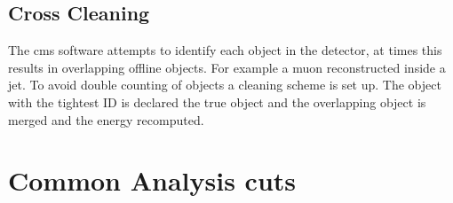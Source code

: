 \subsection{Cross Cleaning} %
\label{sub:cross_cleaning}
The \ac{cms} software attempts to identify each object in the detector, at 
times this results in overlapping offline objects. For example a muon 
reconstructed inside a jet. To avoid double counting of objects a cleaning 
scheme is set up. The object with the tightest ID is declared the true object 
and the overlapping object is merged and the energy recomputed.


\section{Common Analysis cuts} %
\label{sec:common_analysis_cuts}



